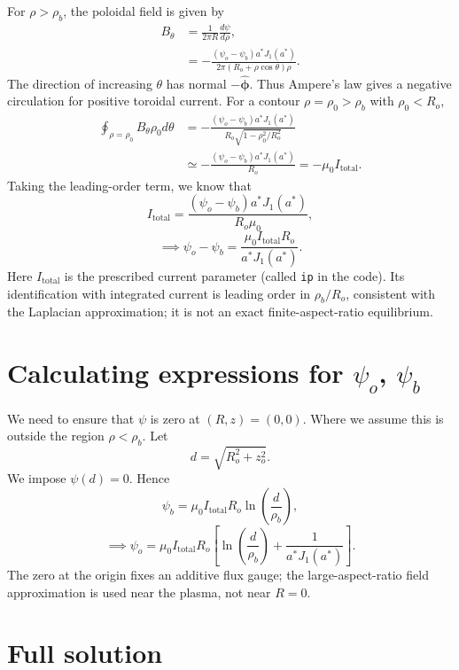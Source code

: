 \documentclass{article}
\begin{document}
For $\rho>\rho_b$, the poloidal field is given by
\[\begin{aligned}
B_\theta &= \frac{1}{2\pi R}\frac{d\psi}{d\rho}, \\
&= -\frac{(\psi_o-\psi_b)a^*J_1(a^*)}{2\pi(R_o+\rho\cos\theta)\rho}.
\end{aligned}\]
The direction of increasing $\theta$ has normal $-\mathbf{\hat{\phi}}$.
Thus Ampere's law gives a negative circulation for positive toroidal current.
For a contour $\rho=\rho_0>\rho_b$ with $\rho_0<R_o$,
\[\begin{aligned}
\oint_{\rho=\rho_0}B_\theta \rho_0d\theta
&= -\frac{(\psi_o-\psi_b)a^*J_1(a^*)}{R_o\sqrt{1-\rho_0^2/R_o^2}}\\
&\simeq -\frac{(\psi_o-\psi_b)a^*J_1(a^*)}{R_o}
=-\mu_0 I_\text{total}.
\end{aligned}\]
Taking the leading-order term, we know that
\[I_\text{total} = \frac{(\psi_o-\psi_b)a^*J_1(a^*)}{R_o\mu_0},\]
\[\implies \psi_o-\psi_b = \frac{\mu_0I_\text{total} R_o}{a^*J_1(a^*)}.\]
Here $I_\text{total}$ is the prescribed current parameter (called \texttt{ip} in the code).
Its identification with integrated current is leading order in $\rho_b/R_o$,
consistent with the Laplacian approximation; it is not an exact finite-aspect-ratio equilibrium.

\section{Calculating expressions for $\psi_o$, $\psi_b$}

We need to ensure that $\psi$ is zero at $(R, z) = (0,0)$. Where we assume this is outside the region $\rho<\rho_b$.
Let
\[d = \sqrt{R_o^2+z_o^2}.\]
We impose $\psi(d) = 0$. Hence
\[\psi_b = \mu_0I_\text{total}R_o\ln\left(\frac{d}{\rho_b}\right),\]
\[\implies \psi_o = \mu_0I_\text{total}R_o\left[\ln\left(\frac{d}{\rho_b}\right)+\frac{1}{a^*J_1(a^*)}\right].\]
The zero at the origin fixes an additive flux gauge; the large-aspect-ratio field
approximation is used near the plasma, not near $R=0$.

\section{Full solution}
\end{document}
